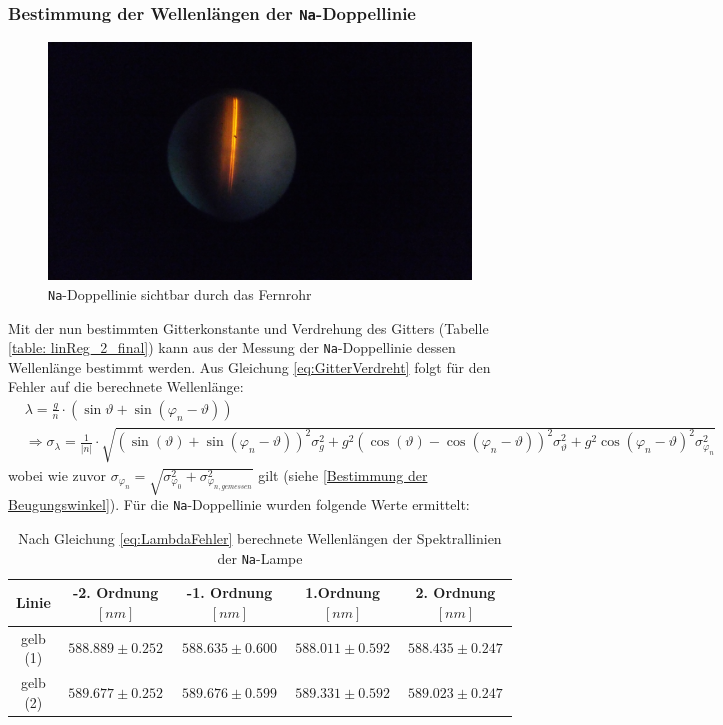 \documentclass[a4paper, 11pt]{article}
\begin{document}
\subsubsection{Bestimmung der Wellenlängen der \texttt{Na}-Doppellinie}
\begin{figure}[H]
	\centering
	\includegraphics[trim={20cm 10cm 30cm 10cm},clip=true,scale=0.1]{./Bilder/IMG_20170915_130348.jpg}
	\caption{\texttt{Na}-Doppellinie sichtbar durch das Fernrohr}
	\label{pic:NaDoppellinie}
\end{figure}


Mit der nun bestimmten Gitterkonstante und Verdrehung des Gitters (Tabelle \ref{table: linReg_2_final}) kann aus der Messung der \texttt{Na}-Doppellinie dessen Wellenlänge bestimmt werden. Aus Gleichung \ref{eq:GitterVerdreht} folgt für den Fehler auf die berechnete Wellenlänge:
\begin{eqnarray*}\label{eq:LambdaFehler}
& \lambda = \frac{g}{n} \cdot ( \sin{\vartheta} + \sin(\varphi_n - \vartheta) )
\\
& \Rightarrow \sigma_\lambda = \frac{1}{|n|} \cdot \sqrt{ \left(\sin(\vartheta)+\sin(\varphi_n-\vartheta)\right)^2 \sigma_g^2 + g^2\left(\cos(\vartheta)-\cos(\varphi_n-\vartheta)\right)^2 \sigma_\vartheta^2 + g^2 \cos(\varphi_n-\vartheta)^2 \sigma_{\varphi_n}^2     }
\end{eqnarray*}
wobei wie zuvor $\sigma_{\varphi_n} = \sqrt{\sigma_{\varphi_0}^2+\sigma_{\varphi_{n,gemessen}}^2}$ gilt (siehe \ref{Bestimmung der Beugungswinkel}).
Für die \texttt{Na}-Doppellinie wurden folgende Werte ermittelt:

\begin{table}[H]
	\large
	\centering
	\begin{tabular}{|c|c|c|c|c|}
		\hline 
		Linie & -2. Ordnung $[nm]$  &   -1. Ordnung $[nm]$ &   1.Ordnung $[nm]$    &   2. Ordnung $[nm]$ \\
		\hline
		gelb (1) &   $588.889 \pm 0.252$   &   $588.635 \pm 0.600$    &   $588.011 \pm 0.592$    &   $588.435 \pm 0.247$ \\
		\hline
		gelb (2)  &   $589.677 \pm 0.252$   &   $589.676 \pm 0.599$    &   $589.331 \pm 0.592$    &   $589.023 \pm 0.247$ \\
		\hline
	\end{tabular}
	\caption{Nach Gleichung \ref{eq:LambdaFehler} berechnete Wellenlängen der Spektrallinien der \texttt{Na}-Lampe}
	\label{table:gemNaWellenlängen}
\end{table}
\end{document}
